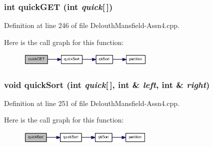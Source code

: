 \hypertarget{_delouth_mansfield-_assn4_8cpp_a9c524d18ebb0b180ce26264cf9f01c33}{
\subsubsection[{quickGET}]{\setlength{\rightskip}{0pt plus 5cm}int quickGET (int {\em quick}\mbox{[}$\,$\mbox{]})}}
\label{_delouth_mansfield-_assn4_8cpp_a9c524d18ebb0b180ce26264cf9f01c33}


Definition at line 246 of file DelouthMansfield-\/Assn4.cpp.



Here is the call graph for this function:\nopagebreak
\begin{figure}[H]
\begin{center}
\leavevmode
\includegraphics[width=184pt]{_delouth_mansfield-_assn4_8cpp_a9c524d18ebb0b180ce26264cf9f01c33_cgraph}
\end{center}
\end{figure}


\hypertarget{_delouth_mansfield-_assn4_8cpp_a9737d54cba3a8ffec81c622892328116}{
\subsubsection[{quickSort}]{\setlength{\rightskip}{0pt plus 5cm}void quickSort (int {\em quick}\mbox{[}$\,$\mbox{]}, \/  int \& {\em left}, \/  int \& {\em right})}}
\label{_delouth_mansfield-_assn4_8cpp_a9737d54cba3a8ffec81c622892328116}


Definition at line 251 of file DelouthMansfield-\/Assn4.cpp.



Here is the call graph for this function:\nopagebreak
\begin{figure}[H]
\begin{center}
\leavevmode
\includegraphics[width=183pt]{_delouth_mansfield-_assn4_8cpp_a9737d54cba3a8ffec81c622892328116_cgraph}
\end{center}
\end{figure}


